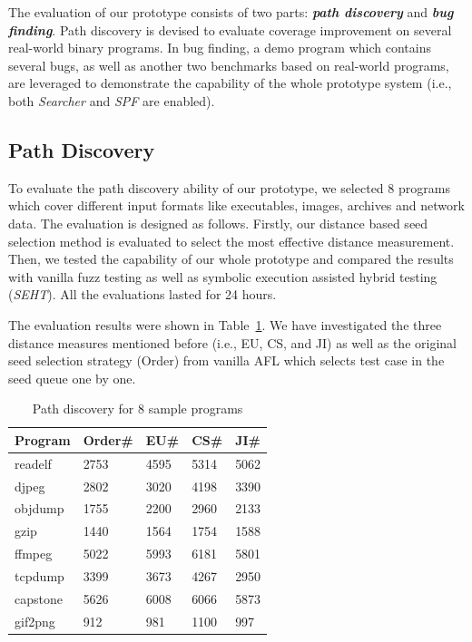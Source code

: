 The evaluation of our prototype consists of two parts: \textbf{\emph{path discovery}} and \textbf{\emph{bug finding}}. 
 Path discovery is devised to evaluate coverage improvement on several real-world binary programs. 
 In bug finding, a demo program which contains several bugs, as well as another two benchmarks based on real-world programs, are leveraged to demonstrate the capability of the whole prototype system (i.e., both \textit{Searcher} and \textit{SPF} are enabled).


\subsection{Path Discovery}
To evaluate the path discovery ability of our prototype, we selected 8 programs which cover different input formats like executables, images, archives and network data. 
 The evaluation is designed as follows. 
 Firstly, our distance based seed selection method is evaluated to select the most effective distance measurement. 
 Then, we tested the capability of our whole prototype and compared the results with vanilla fuzz testing as well as symbolic execution assisted hybrid testing (\textit{SEHT}). 
 All the evaluations lasted for 24 hours.



The evaluation results were shown in Table~\ref{PD-8samples}. We have investigated the three distance measures mentioned before (i.e., EU, CS, and JI) as well as the original seed selection strategy (Order) from vanilla AFL which selects test case in the seed queue one by one.

\begin{table}
  \caption{\label{PD-8samples}Path discovery for 8 sample programs}
  \centering
	\begin{tabular}{p{2cm}<{\centering} p{1.5cm}<{\centering} p{1.5cm}<{\centering} p{1.5cm}<{\centering} p{1.5cm}<{\centering}}
		\toprule
		Program  & Order\# & EU\# & CS\# & JI\# \\ 
		\midrule
		readelf  &    2753 & 4595 & 5314 & 5062 \\
		 djpeg   &    2802 & 3020 & 4198 & 3390 \\
		objdump  &    1755 & 2200 & 2960 & 2133 \\
		  gzip   &    1440 & 1564 & 1754 & 1588 \\
		 ffmpeg  &    5022 & 5993 & 6181 & 5801 \\
		tcpdump  &    3399 & 3673 & 4267 & 2950 \\
		capstone &    5626 & 6008 & 6066 & 5873 \\
		gif2png  &     912 &  981 & 1100 &  997 \\ 
		\bottomrule
	\end{tabular}
\end{table}

